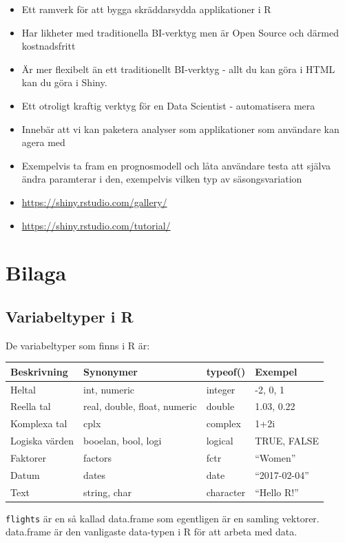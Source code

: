 \documentclass[
]{book}
\providecommand{\tightlist}{%
  \setlength{\itemsep}{0pt}\setlength{\parskip}{0pt}}
\begin{document}
\begin{itemize}
\tightlist
\item
  Ett ramverk för att bygga skräddarsydda applikationer i R
\item
  Har likheter med traditionella BI-verktyg men är Open Source och därmed kostnadsfritt
\item
  Är mer flexibelt än ett traditionellt BI-verktyg - allt du kan göra i HTML kan du göra i Shiny.
\item
  Ett otroligt kraftig verktyg för en Data Scientist - automatisera mera
\item
  Innebär att vi kan paketera analyser som applikationer som användare kan agera med
\item
  Exempelvis ta fram en prognosmodell och låta användare testa att själva ändra paramterar i den, exempelvis vilken typ av säsongsvariation
\item
  \url{https://shiny.rstudio.com/gallery/}
\item
  \url{https://shiny.rstudio.com/tutorial/}
\end{itemize}

\hypertarget{bilaga}{%
\chapter{Bilaga}\label{bilaga}}

\hypertarget{variabeltyper-i-r}{%
\section{Variabeltyper i R}\label{variabeltyper-i-r}}

De variabeltyper som finns i R är:

\begin{longtable}[]{@{}llll@{}}
\toprule
Beskrivning & Synonymer & typeof() & Exempel\tabularnewline
\midrule
\endhead
Heltal & int, numeric & integer & -2, 0, 1\tabularnewline
Reella tal & real, double, float, numeric & double & 1.03, 0.22\tabularnewline
Komplexa tal & cplx & complex & 1+2i\tabularnewline
Logiska värden & booelan, bool, logi & logical & TRUE, FALSE\tabularnewline
Faktorer & factors & fctr & ``Women''\tabularnewline
Datum & dates & date & ``2017-02-04''\tabularnewline
Text & string, char & character & ``Hello R!''\tabularnewline
\bottomrule
\end{longtable}

\texttt{flights} är en så kallad data.frame som egentligen är en samling vektorer. data.frame är den vanligaste data-typen i R för att arbeta med data.
\end{document}
